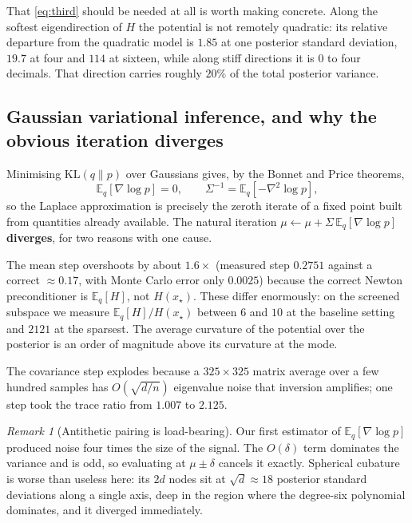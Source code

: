 \documentclass[11pt]{article}
\newcommand{\E}{\mathbb{E}}
\newcommand{\xmap}{x_{\star}}
\theoremstyle{plain}
\theoremstyle{definition}
\theoremstyle{remark}
\newtheorem{remark}{Remark}
\begin{document}
That \eqref{eq:third} should be needed at all is worth making concrete. Along the softest
eigendirection of $H$ the potential is not remotely quadratic: its relative departure from the
quadratic model is $1.85$ at one posterior standard deviation, $19.7$ at four and $114$ at sixteen,
while along stiff directions it is $0$ to four decimals. That direction carries roughly $20\%$ of
the total posterior variance.

\subsection{Gaussian variational inference, and why the obvious iteration diverges}

Minimising $\mathrm{KL}(q\|p)$ over Gaussians gives, by the Bonnet and Price theorems,
\begin{equation}
\label{eq:vi}
  \E_q[\nabla\log p] = 0, \qquad \Sigma^{-1} = \E_q[-\nabla^2\log p],
\end{equation}
so the Laplace approximation is precisely the zeroth iterate of a fixed point built from quantities
already available. The natural iteration $\mu \leftarrow \mu + \Sigma\,\E_q[\nabla\log p]$
\textbf{diverges}, for two reasons with one cause.

The mean step overshoots by about $1.6\times$ (measured step $0.2751$ against a correct $\approx
0.17$, with Monte Carlo error only $0.0025$) because the correct Newton preconditioner is
$\E_q[H]$, not $H(\xmap)$. These differ enormously: on the screened subspace we measure
$\E_q[H]/H(\xmap)$ between $6$ and $10$ at the baseline setting and $2121$ at the sparsest. The
average curvature of the potential over the posterior is an order of magnitude above its curvature
at the mode.

The covariance step explodes because a $325\times325$ matrix average over a few hundred samples has
$O(\sqrt{d/n})$ eigenvalue noise that inversion amplifies; one step took the trace ratio from
$1.007$ to $2.125$.

\begin{remark}[Antithetic pairing is load-bearing]
Our first estimator of $\E_q[\nabla\log p]$ produced noise four times the size of the signal. The
$O(\delta)$ term dominates the variance and is odd, so evaluating at $\mu\pm\delta$ cancels it
exactly. Spherical cubature is worse than useless here: its $2d$ nodes sit at $\sqrt d \approx 18$
posterior standard deviations along a single axis, deep in the region where the degree-six
polynomial dominates, and it diverged immediately.
\end{remark}
\end{document}
